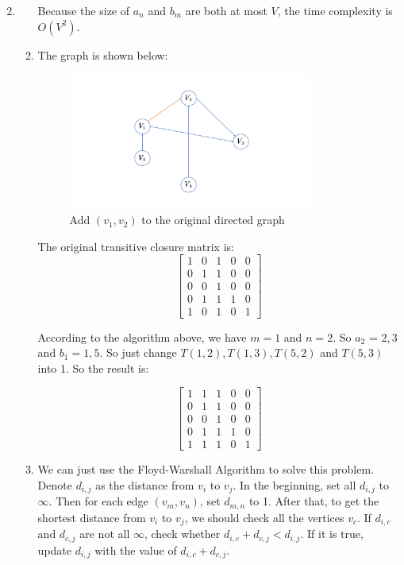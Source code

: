 \documentclass[12pt,a4paper]{article}
\makeatletter
\newtheorem*{solution}{Solution}
\theoremstyle{definition}
\renewenvironment{solution}[1][Solution] {\par\pushQED{\qed}\normalfont\topsep6\p@\@plus6\p@\relax\trivlist\item[\hskip\labelsep\bfseries#1\@addpunct{.}]\ignorespaces}{\popQED\endtrivlist\@endpefalse} \makeatother
\makeatother
\begin{document}
\begin{enumerate}
\begin{solution}
\begin{enumerate}
			Because the size of $ a_{n} $ and $ b_{m} $ are both at most $ V $, the time complexity is $ O(V^{2}) $.
			\newpage
			\item The graph is shown below:
				\begin{figure}[H]
				\centering
				\includegraphics[width=0.8\textwidth]{fig.pdf}
				\caption{Add $ (v_1,v_2) $ to the original directed graph}
				\label{Fig-EscapeProblem}
				\end{figure}
			The original transitive closure matrix is:
			$$ \left[ \begin{array}{ccccc}
				1 & 0 & 1 & 0 & 0\\
				0 & 1 & 1 & 0 & 0\\
				0 & 0 & 1 & 0 & 0\\
				0 & 1 & 1 & 1 & 0\\
				1 & 0 & 1 & 0 & 1 
				\end{array} 
				\right ] $$
			
				According to the algorithm above, we have $ m = 1 $ and $ n = 2 $. So $ a_{2} $ = $ {2,3} $ and $ b_{1} = {1,5} $. So just change $ T(1,2), T(1,3), T(5,2) $ and $ T(5,3) $ into 1. So the result is:

				$$ \left[ \begin{array}{ccccc}
					1 & 1 & 1 & 0 & 0\\
					0 & 1 & 1 & 0 & 0\\
					0 & 0 & 1 & 0 & 0\\
					0 & 1 & 1 & 1 & 0\\
					1 & 1 & 1 & 0 & 1 
					\end{array} 
					\right ] $$
			\item We can just use the Floyd-Warshall Algorithm to solve this problem. Denote $ d_{i,j}$ as the distance from $ v_i $ to $ v_j $. In the beginning, set all  $ d_{i,j} $ to $ \infty $. Then for each edge $ (v_m, v_n) $, set $ d_{m,n} $ to 1. After that, to get the shortest distance from $ v_i $ to $ v_j $, we should check all the vertices $ v_c $. If $ d_{i,c} $ and $ d_{c,j} $ are not all $ \infty $, check whether $ d_{i,c} + d_{c,j} < d_{i,j} $. If it is true, update $ d_{i,j} $ with the value of $ d_{i,c} + d_{c,j} $. 
			

\end{enumerate}
\end{solution}
\end{enumerate}
\end{document}
